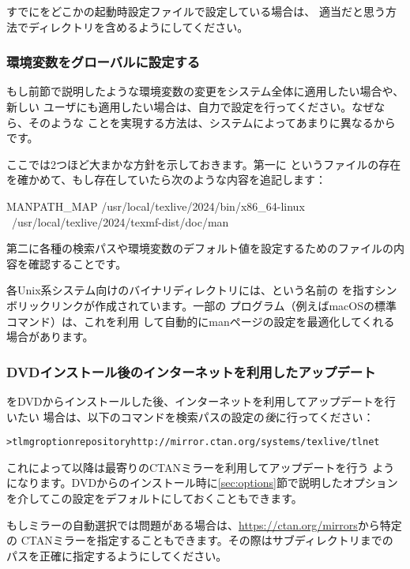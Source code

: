 \documentclass[uplatex,dvipdfmx,12pt,tombow]{jsarticle}
\begin{document}
すでにをどこかの起動時設定ファイルで設定している場合は、
適当だと思う方法で\TL ディレクトリを含めるようにしてください。

\subsubsection{環境変数をグローバルに設定する}
\label{sec:envglobal}

もし前節で説明したような環境変数の変更をシステム全体に適用したい場合や、新しい
ユーザにも適用したい場合は、自力で設定を行ってください。なぜなら、そのような
ことを実現する方法は、システムによってあまりに異なるからです。

ここでは2つほど大まかな方針を示しておきます。第一に%
というファイルの存在を確かめて、もし存在していたら次のような内容を追記します：
%
\begin{sverbatim}
MANPATH_MAP /usr/local/texlive/2024/bin/x86_64-linux \
            /usr/local/texlive/2024/texmf-dist/doc/man
\end{sverbatim}
%
第二に各種の検索パスや環境変数のデフォルト値を設定するためのファイルの内容を確認することです。

各Unix系システム向けのバイナリディレクトリには、という名前の
を指すシンボリックリンクが作成されています。一部の
プログラム（例えばmacOSの標準コマンド）は、これを利用
して自動的にmanページの設定を最適化してくれる場合があります。

\subsubsection{DVDインストール後のインターネットを利用したアップデート}
\label{sec:dvd-install-net-updates}

\TL をDVDからインストールした後、インターネットを利用してアップデートを行いたい
場合は、以下のコマンドを検索パスの設定の\emph{後}に行ってください：
%
\begin{alltt}
> tlmgr option repository http://mirror.ctan.org/systems/texlive/tlnet
\end{alltt}
%
これによって以降は最寄りのCTANミラーを利用してアップデートを行う
ようになります。DVDからのインストール時に\ref{sec:options}節で説明したオプション
を介してこの設定をデフォルトにしておくこともできます。

もしミラーの自動選択では問題がある場合は、\url{https://ctan.org/mirrors}から特定の
CTANミラーを指定することもできます。その際はサブディレクトリまでの
パスを正確に指定するようにしてください。
\end{document}
